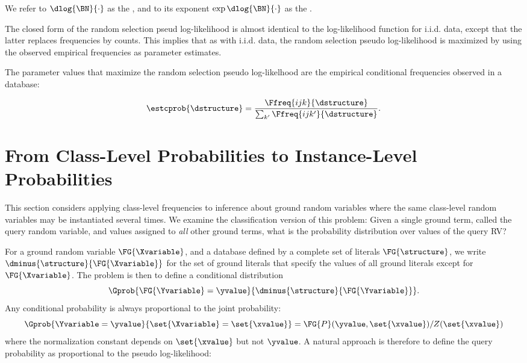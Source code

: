 \documentclass{article}
\begin{document}
We refer to $\dlog{\BN}{\cdot}$ as the , and to its exponent $\exp \dlog{\BN}{\cdot}$ as the . 

The closed form of the random selection pseud log-likelihood is almost identical to the log-likelihood function for i.i.d. data, except that the latter replaces frequencies by counts. This implies that as with i.i.d. data, the random selection pseudo log-likelihood is maximized by using the observed empirical frequencies as parameter estimates. 

\begin{proposition} \label{prop:maximize}
The parameter values that maximize the random selection pseudo log-likelhood are the empirical conditional frequencies observed in a database:

\[\estcprob{\dstructure} = 
\frac
{\Ffreq{ijk}{\dstructure}}
{\sum_{k'}\Ffreq{ijk'}{\dstructure}}
.\]
\end{proposition}

\section{From Class-Level Probabilities to Instance-Level Probabilities}



This section considers applying class-level frequencies to inference about ground random variables where the same class-level random variables may be instantiated several times. We examine the classification version of this problem: Given a single ground term, called the query random variable, and values assigned to {\em all} other ground terms, what is the probability distribution over values of the query RV? 

For a ground random variable $\FG{\Xvariable}$, and a database defined by a complete set of literals $\FG{\structure}$, we write $\dminus{\structure}{\FG{\Xvariable}}$ for the set of ground literals that specify the values of all ground literals except for $\FG{\Xvariable}$. The problem is then to define a conditional distribution $$\Gprob{\FG{\Yvariable} =\yvalue}{\dminus{\structure}{\FG{\Yvariable}}}.$$ Any conditional probability is always proportional to the joint probability: $$\Gprob{\Yvariable = \yvalue}{\set{\Xvariable} = \set{\xvalue}} = \FG{P}(\yvalue,\set{\xvalue})/Z(\set{\xvalue})$$ where the normalization constant depends on $\set{\xvalue}$ but not $\yvalue$. A natural approach is therefore to define the query probability as proportional to the pseudo log-likelihood:
\end{document}
